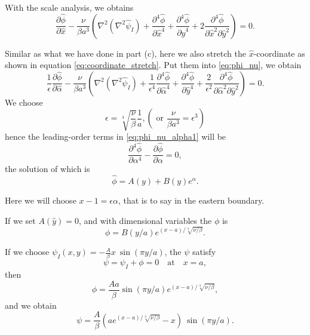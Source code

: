 \documentclass[a4paper]{article}
\begin{document}
\begin{enumerate}[label=\textbf{\arabic*.}]
\begin{enumerate}[label=\textbf{(\alph*)}]
		With the scale analysis, we obtains
		\begin{equation}\label{eq:phi_nu}
			\frac{\partial \hat{\phi}}{\partial \hat{x}} - \frac{\nu}{\beta a^3} \left(\nabla^2\left(\nabla^{2}\hat{\psi}_I\right)+ \frac{\partial^4 \hat{\phi}}{\partial \hat{x}^4} + \frac{\partial^4 \hat{\phi}}{\partial \hat{y}^4} + 2\frac{\partial^4 \hat{\phi}}{\partial \hat{x}^2\partial \hat{y}^2} \right) = 0.
		\end{equation}
		
		Similar as what we have done in part (c), here we also stretch the $\hat{x}$-coordinate as shown in equation \eqref{eq:coordinate_stretch}. Put them into \eqref{eq:phi_nu}, we obtain
		\begin{equation}\label{eq:phi_nu_alpha1}
		\frac{1}{\epsilon} \frac{\partial \hat{\phi}}{\partial \hat{\alpha}} - \frac{\nu}{\beta a^3} \left(\nabla^2\left(\nabla^{2}\hat{\psi}_I\right)+ \frac{1}{\epsilon ^4}\frac{\partial^4 \hat{\phi}}{\partial \hat{\alpha}^4} + \frac{\partial^4 \hat{\phi}}{\partial \hat{y}^4} + \frac{2}{\epsilon^2}\frac{\partial^4 \hat{\phi}}{\partial \hat{\alpha}^2\partial \hat{y}^2} \right) = 0.
		\end{equation}
		We choose $$\epsilon=\sqrt[3]{\frac{\nu}{\beta}}\frac{1}{a}, (\text{ or } \frac{\nu}{\beta a^3}= \epsilon^3)$$ hence the leading-order terms in \eqref{eq:phi_nu_alpha1} will be
		$$\frac{\partial^4 \hat{\phi}}{ \partial\alpha^4} - \frac{\partial \hat{\phi}}{ \partial\alpha} = 0,$$
		the solution of which is
		$$\hat{\phi} = A(y)+B(y)e^{\alpha}.$$
		
		Here we will choose $x-1=\epsilon \alpha$, that is to say in the eastern boundary. 
		
		If we set $A(\hat{y})=0$, and with dimensional variables the $\phi$ is
		$$\phi = B(y/a)e^{(x-a)/\sqrt[3]{\nu/\beta}}.$$
		
		If we choose $\psi_I(x,y) =  -\frac{A}{\beta}x~\sin (\pi y/a)$, the $\psi$ satisfy
		$$\psi=\psi_I+\phi =0 \quad \text{at}\quad x=a,$$
		then 
		$$\phi = \frac{Aa}{\beta}\sin (\pi y/a) e^{(x-a)/\sqrt[3]{\nu/\beta}},$$
		and we obtain
		$$\psi = \frac{A}{\beta}\left(ae^{(x-a)/\sqrt[3]{\nu/\beta}}-x\right)~\sin (\pi y/a).$$
		
	\end{enumerate}

\end{enumerate}
\end{document}
